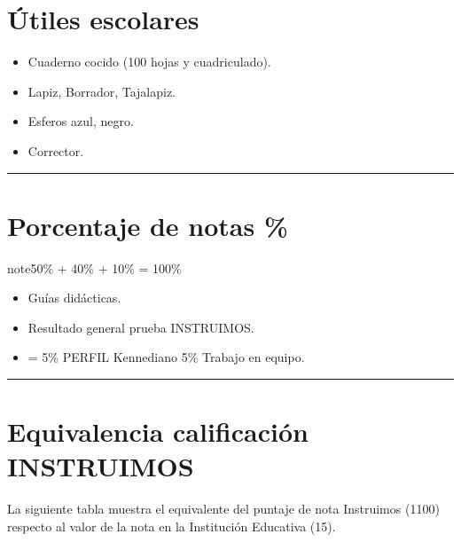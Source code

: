 \documentclass[letterpaper,10pt,spanish]{sphinxmanual}
\begin{document}
\section{Útiles escolares}
\label{\detokenize{0_intro/informacion:utiles-escolares}}\begin{itemize}
\item {} 
\sphinxAtStartPar
Cuaderno cocido (100 hojas y cuadriculado).

\item {} 
\sphinxAtStartPar
Lapiz, Borrador, Tajalapiz.

\item {} 
\sphinxAtStartPar
Esferos azul, negro.

\item {} 
\sphinxAtStartPar
Corrector.

\end{itemize}


\bigskip\hrule\bigskip



\section{Porcentaje de notas \%}
\label{\detokenize{0_intro/informacion:porcentaje-de-notas}}
\begin{sphinxadmonition}{note}{50\% + 40\% + 10\% = 100\%}
\begin{itemize}
\item {} 
\sphinxAtStartPar
{} Guías didácticas.

\item {} 
\sphinxAtStartPar
{} Resultado general prueba INSTRUIMOS.

\item {} 
\sphinxAtStartPar
{} = 5\% PERFIL Kennediano \sphinxstylestrong{+} 5\% Trabajo en equipo.

\end{itemize}
\end{sphinxadmonition}


\bigskip\hrule\bigskip



\section{Equivalencia calificación INSTRUIMOS}
\label{\detokenize{0_intro/informacion:equivalencia-calificacion-instruimos}}
\sphinxAtStartPar
La siguiente tabla muestra el equivalente del puntaje de nota Instruimos (1\sphinxhyphen{}100) respecto al valor de la nota en la Institución Educativa (1\sphinxhyphen{}5).
\end{document}
